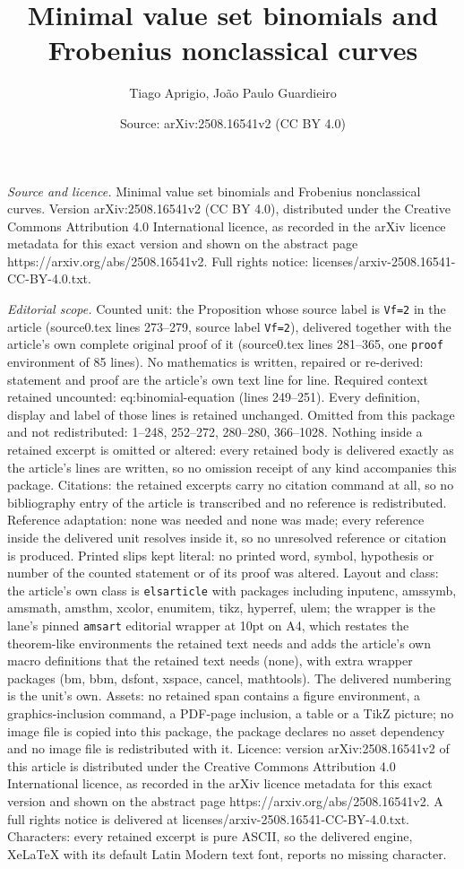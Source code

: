\documentclass[10pt,a4paper]{amsart}
\title[Minimal value set binomials and Frobenius nonclassical curve]{Minimal value set binomials and Frobenius nonclassical curves}
\author{Tiago Aprigio, Jo\~ao Paulo Guardieiro}
\date{Source: arXiv:2508.16541v2 (CC BY 4.0)}
\begin{document}
\maketitle

\noindent\emph{Source and licence.} Minimal value set binomials and Frobenius nonclassical curves. Version arXiv:2508.16541v2 (CC BY 4.0), distributed under the Creative Commons Attribution 4.0 International licence, as recorded in the arXiv licence metadata for this exact version and shown on the abstract page https://arxiv.org/abs/2508.16541v2. Full rights notice: licenses/arxiv-2508.16541-CC-BY-4.0.txt.\par\smallskip

\noindent\textit{Editorial scope.} Counted unit: the Proposition whose source label is \texttt{Vf=2} in the article (source0.tex lines 273--279, source label \texttt{Vf=2}), delivered together with the article's own complete original proof of it (source0.tex lines 281--365, one \texttt{proof} environment of 85 lines). No mathematics is written, repaired or re-derived: statement and proof are the article's own text line for line. Required context retained uncounted: eq:binomial-equation (lines 249--251). Every definition, display and label of those lines is retained unchanged. Omitted from this package and not redistributed: 1--248, 252--272, 280--280, 366--1028. Nothing inside a retained excerpt is omitted or altered: every retained body is delivered exactly as the article's lines are written, so no omission receipt of any kind accompanies this package. Citations: the retained excerpts carry no citation command at all, so no bibliography entry of the article is transcribed and no reference is redistributed. Reference adaptation: none was needed and none was made; every reference inside the delivered unit resolves inside it, so no unresolved reference or citation is produced. Printed slips kept literal: no printed word, symbol, hypothesis or number of the counted statement or of its proof was altered. Layout and class: the article's own class is \texttt{elsarticle} with packages including inputenc, amssymb, amsmath, amsthm, xcolor, enumitem, tikz, hyperref, ulem; the wrapper is the lane's pinned \texttt{amsart} editorial wrapper at 10pt on A4, which restates the theorem-like environments the retained text needs and adds the article's own macro definitions that the retained text needs (none), with extra wrapper packages (bm, bbm, dsfont, xspace, cancel, mathtools). The delivered numbering is the unit's own. Assets: no retained span contains a figure environment, a graphics-inclusion command, a PDF-page inclusion, a table or a TikZ picture; no image file is copied into this package, the package declares no asset dependency and no image file is redistributed with it. Licence: version arXiv:2508.16541v2 of this article is distributed under the Creative Commons Attribution 4.0 International licence, as recorded in the arXiv licence metadata for this exact version and shown on the abstract page https://arxiv.org/abs/2508.16541v2. A full rights notice is delivered at licenses/arxiv-2508.16541-CC-BY-4.0.txt. Characters: every retained excerpt is pure ASCII, so the delivered engine, XeLaTeX with its default Latin Modern text font, reports no missing character.
\end{document}
